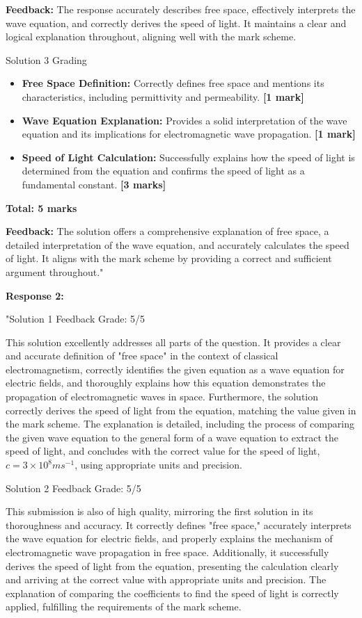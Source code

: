 \documentclass[a4paper,11pt]{article}
\begin{document}
\textbf{Feedback:} The response accurately describes free space, effectively interprets the wave equation, and correctly derives the speed of light. It maintains a clear and logical explanation throughout, aligning well with the mark scheme.

Solution 3 Grading

\begin{itemize}
    \item \textbf{Free Space Definition:} Correctly defines free space and mentions its characteristics, including permittivity and permeability. \textbf{[1 mark]}
    \item \textbf{Wave Equation Explanation:} Provides a solid interpretation of the wave equation and its implications for electromagnetic wave propagation. \textbf{[1 mark]}
    \item \textbf{Speed of Light Calculation:} Successfully explains how the speed of light is determined from the equation and confirms the speed of light as a fundamental constant. \textbf{[3 marks]}
\end{itemize}

\textbf{Total: 5 marks}

\textbf{Feedback:} The solution offers a comprehensive explanation of free space, a detailed interpretation of the wave equation, and accurately calculates the speed of light. It aligns with the mark scheme by providing a correct and sufficient argument throughout."

\textbf{Response 2:}

"Solution 1 Feedback
Grade: 5/5

This solution excellently addresses all parts of the question. It provides a clear and accurate definition of "free space" in the context of classical electromagnetism, correctly identifies the given equation as a wave equation for electric fields, and thoroughly explains how this equation demonstrates the propagation of electromagnetic waves in space. Furthermore, the solution correctly derives the speed of light from the equation, matching the value given in the mark scheme. The explanation is detailed, including the process of comparing the given wave equation to the general form of a wave equation to extract the speed of light, and concludes with the correct value for the speed of light, \(c = 3 \times 10^8 ms^{-1}\), using appropriate units and precision.

Solution 2 Feedback
Grade: 5/5

This submission is also of high quality, mirroring the first solution in its thoroughness and accuracy. It correctly defines "free space," accurately interprets the wave equation for electric fields, and properly explains the mechanism of electromagnetic wave propagation in free space. Additionally, it successfully derives the speed of light from the equation, presenting the calculation clearly and arriving at the correct value with appropriate units and precision. The explanation of comparing the coefficients to find the speed of light is correctly applied, fulfilling the requirements of the mark scheme.
\end{document}
